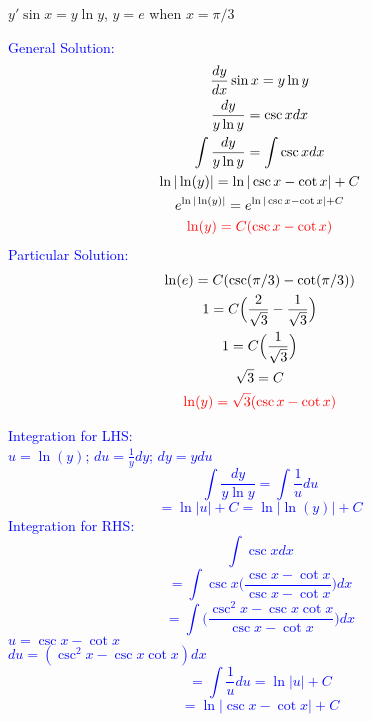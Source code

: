 \item $y'\sin x = y\ln y$, $y=e$ when $x=\pi/3$

\textcolor{blue}{
    \begin{minipage}[t]{0.45\textwidth}
        General Solution:
        \begin{gather*}
            \frac{dy}{dx}\sin x = y\ln y \\
            \frac{dy}{y\ln y} = \csc x dx\\
            \int \frac{dy}{y\ln y} = \int \csc x dx \\
            \ln|\ln(y)| = \ln|\csc x - \cot x|+C \\
            e^{\ln|\ln(y)|} = e^{\ln|\csc x - \cot x|+C} \\
            \textcolor{red}{
            \ln(y) = C(\csc x - \cot x)
            }
        \end{gather*}
        Particular Solution:
        \begin{gather*}
            \ln(e)=C(\csc(\pi/3) - \cot(\pi/3))\\
            1=C\Big(\frac{2}{\sqrt3} - \frac{1}{\sqrt3}\Big)\\
            1=C\Big(\frac{1}{\sqrt3}\Big) \\
            \sqrt3=C \\
            \textcolor{red}{
            \ln(y) = \sqrt3(\csc x - \cot x)
            }
        \end{gather*}
    \end{minipage}
    \hfill   
    \begin{minipage}[t]{0.45\textwidth}
        Integration for LHS:\\
        $u = \ln(y)$; $du = \frac{1}{y}dy$; $dy = ydu$      
        \[
            \int \frac{dy}{y\ln y} = \int \frac{1}{u}du 
        \]
        \[
            = \ln|u|+C=\ln|\ln(y)|+C
        \]
        Integration for RHS:\\
        \[
        \int \csc x dx 
        \]
        \[
            = \int \csc x\Big(\frac{\csc x - \cot x}{\csc x - \cot x}\Big) dx
        \]
        \[
            = \int\Big(\frac{\csc^2 x - \csc x \cot x}{\csc x - \cot x}\Big) dx
        \]
        $u = \csc x - \cot x$\\
        $du = (\csc^2x-\csc x \cot x) dx$   
        \[
            = \int\frac{1}{u} du = \ln|u|+C
        \]
        \[
            = \ln|\csc x - \cot x|+C
        \]
    \end{minipage}
}